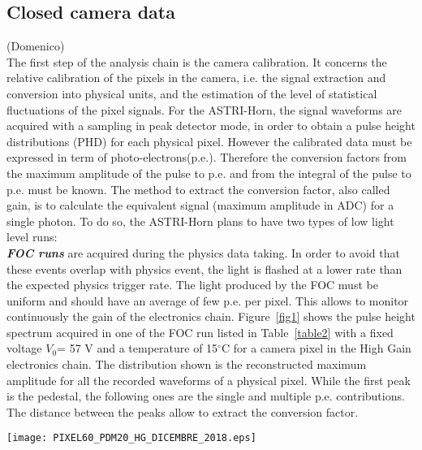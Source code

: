 \subsection{Closed camera data} (Domenico)\\
The first step of the analysis chain is the camera calibration. 
It concerns the relative calibration 
of the pixels in the camera, i.e. the signal extraction and conversion into 
physical units, and the estimation of the level of statistical 
fluctuations of the pixel signals.
For the ASTRI-Horn, the signal waveforms are acquired with a 
sampling in peak detector mode, in order to obtain a pulse height distributions (PHD) for 
each physical pixel.
However the calibrated data must be expressed in term of 
photo-electrons(p.e.). Therefore the conversion factors from the maximum 
amplitude of the pulse to p.e. and from the integral of the pulse to p.e. 
must be known. 
The method to extract the conversion factor, also called gain, is to calculate the equivalent 
signal (maximum amplitude in ADC) for a single photon.
To do so, the ASTRI-Horn plans to have two types of low light level runs:\\
\textbf{\textit{FOC runs}} are acquired during the physics data taking.
In order to avoid that these events overlap with physics event, the light is flashed 
at a lower rate than the expected physics trigger rate. The light 
produced by the FOC must be uniform and should have an average of 
few p.e. per pixel. This allows to monitor continuously the gain of the 
electronics chain. Figure~\ref{fig1} shows the pulse height spectrum acquired in one of the FOC run listed in Table~\ref{table2} with a fixed voltage $V_{0}$= 57 V 
and a temperature of 15$^\circ$C for a camera pixel in the High Gain electronics chain. 
The distribution shown is the reconstructed maximum amplitude for all the 
recorded waveforms of a physical pixel. While the first peak is the pedestal, the following 
ones are the single and multiple p.e. contributions. The distance between 
the peaks allow to extract the conversion factor.\\
\begin{figure*}[ht!!]
\centering
\texttt{[image: PIXEL60\_PDM20\_HG\_DICEMBRE\_2018.eps]}
\vspace{0.5cm}
\caption{ Pulse height spectrum at a fixed temperature of 15$^\circ$C
and $V_{0}$=57 V for a camera pixel, during a FOC run in the HG electronics chain. 
The black curve represents the distribution of the peak detector output and the red curve shows the corresponding
multiple peaks Gaussian fit.}
\label{fig1}
\end{figure*}

